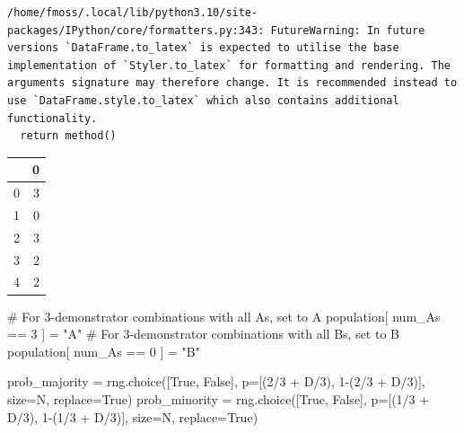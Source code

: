 \documentclass[
  a4paperpaper,
  ,captions=tableheading
]{scrbook}
\newenvironment{Shaded}{\begin{snugshade}}{\end{snugshade}}
\newcommand{\CommentTok}[1]{\textcolor[rgb]{0.37,0.37,0.37}{#1}}
\newcommand{\DecValTok}[1]{\textcolor[rgb]{0.68,0.00,0.00}{#1}}
\newcommand{\NormalTok}[1]{\textcolor[rgb]{0.00,0.23,0.31}{#1}}
\newcommand{\OperatorTok}[1]{\textcolor[rgb]{0.37,0.37,0.37}{#1}}
\newcommand{\StringTok}[1]{\textcolor[rgb]{0.13,0.47,0.30}{#1}}
\newcommand{\VariableTok}[1]{\textcolor[rgb]{0.07,0.07,0.07}{#1}}
\begin{document}
\begin{verbatim}
/home/fmoss/.local/lib/python3.10/site-packages/IPython/core/formatters.py:343: FutureWarning: In future versions `DataFrame.to_latex` is expected to utilise the base implementation of `Styler.to_latex` for formatting and rendering. The arguments signature may therefore change. It is recommended instead to use `DataFrame.style.to_latex` which also contains additional functionality.
  return method()
\end{verbatim}

\begin{tabular}{lr}
\toprule
{} &  0 \\
\midrule
0 &  3 \\
1 &  0 \\
2 &  3 \\
3 &  2 \\
4 &  2 \\
\bottomrule
\end{tabular}

\begin{Shaded}
\begin{Highlighting}[]
\CommentTok{\# For 3{-}demonstrator combinations with all A\textquotesingle{}s, set to A}
\NormalTok{population[ num\_As }\OperatorTok{==} \DecValTok{3}\NormalTok{ ] }\OperatorTok{=} \StringTok{"A"}
\CommentTok{\# For 3{-}demonstrator combinations with all B\textquotesingle{}s, set to B}
\NormalTok{population[ num\_As }\OperatorTok{==} \DecValTok{0}\NormalTok{ ] }\OperatorTok{=} \StringTok{"B"}
\end{Highlighting}
\end{Shaded}

\begin{Shaded}
\begin{Highlighting}[]
\NormalTok{prob\_majority }\OperatorTok{=}\NormalTok{ rng.choice([}\VariableTok{True}\NormalTok{, }\VariableTok{False}\NormalTok{], p}\OperatorTok{=}\NormalTok{[(}\DecValTok{2}\OperatorTok{/}\DecValTok{3} \OperatorTok{+}\NormalTok{ D}\OperatorTok{/}\DecValTok{3}\NormalTok{), }\DecValTok{1}\OperatorTok{{-}}\NormalTok{(}\DecValTok{2}\OperatorTok{/}\DecValTok{3} \OperatorTok{+}\NormalTok{ D}\OperatorTok{/}\DecValTok{3}\NormalTok{)], size}\OperatorTok{=}\NormalTok{N, replace}\OperatorTok{=}\VariableTok{True}\NormalTok{)}
\NormalTok{prob\_minority }\OperatorTok{=}\NormalTok{ rng.choice([}\VariableTok{True}\NormalTok{, }\VariableTok{False}\NormalTok{], p}\OperatorTok{=}\NormalTok{[(}\DecValTok{1}\OperatorTok{/}\DecValTok{3} \OperatorTok{+}\NormalTok{ D}\OperatorTok{/}\DecValTok{3}\NormalTok{), }\DecValTok{1}\OperatorTok{{-}}\NormalTok{(}\DecValTok{1}\OperatorTok{/}\DecValTok{3} \OperatorTok{+}\NormalTok{ D}\OperatorTok{/}\DecValTok{3}\NormalTok{)], size}\OperatorTok{=}\NormalTok{N, replace}\OperatorTok{=}\VariableTok{True}\NormalTok{)}
\end{Highlighting}
\end{Shaded}
\end{document}
